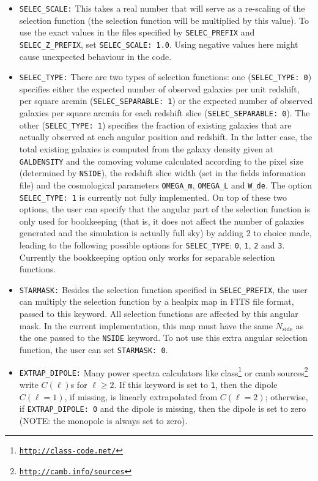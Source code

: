 \documentclass[12pt]{book} %
\newcommand{\nv}[1]{\mathrm{#1}}                 %
\begin{document}
\begin{itemize}
 \item {\tt SELEC\_SCALE:} This takes a real number that will serve as a re-scaling of the selection 
   function (the selection function will be multiplied by this value). To use the exact values in the 
   files specified by {\tt SELEC\_PREFIX} and {\tt SELEC\_Z\_PREFIX}, set {\tt SELEC\_SCALE: 1.0}. 
   Using negative values here might cause unexpected behaviour in the code.  

\item {\tt SELEC\_TYPE:} There are two types of selection functions: one ({\tt SELEC\_TYPE: 0}) 
  specifies either the expected number of observed galaxies per unit redshift, per square arcmin 
  ({\tt SELEC\_SEPARABLE: 1}) or the expected number of observed galaxies per square arcmin for each 
  redshift slice ({\tt SELEC\_SEPARABLE: 0}). The other ({\tt SELEC\_TYPE: 1}) specifies the 
  fraction of existing galaxies that are actually observed at each angular 
  position and redshift. In the latter case, the total existing galaxies 
  is computed from the galaxy density given at {\tt GALDENSITY} and the comoving volume calculated 
  according to the pixel size (determined by {\tt NSIDE}), the redshift slice width (set in the 
  fields information file) and the cosmological parameters {\tt OMEGA\_m}, {\tt OMEGA\_L} and 
  {\tt W\_de}. The option {\tt SELEC\_TYPE: 1} is currently not fully implemented. On top of these 
  two options, the user can specify that the angular part of the selection function is only 
  used for bookkeeping (that is, it does not affect the number of galaxies generated and the 
  simulation is actually full sky) by adding 2 to choice made, leading to the following possible 
  options for {\tt SELEC\_TYPE}: {\tt 0}, {\tt 1}, {\tt 2} and {\tt 3}. Currently the bookkeeping 
  option only works for separable selection functions. 

\item {\tt STARMASK:} Besides the selection function specified in {\tt SELEC\_PREFIX}, the user 
  can multiply the selection function by a {\sc healpix} map in FITS file format, passed to this 
  keyword. All selection functions are affected by this angular mask. In the current implementation, 
  this map must have the same $N_{\nv{side}}$ as the one passed to the {\tt NSIDE} keyword.
  To not use this extra angular selection function, the user can set {\tt STARMASK: 0}.

\item {\tt EXTRAP\_DIPOLE:} Many power spectra calculators like 
  {\sc class}\footnote{\tt{\href{http://class-code.net/}{http://class-code.net/}}} or 
  {\sc camb sources}\footnote{\tt{\href{http://camb.info/sources}{http://camb.info/sources}}} 
  write $C(\ell)$s for $\ell\geq 2$. If this keyword is set to {\tt 1}, then the dipole $C(\ell=1)$, 
  if missing, is linearly extrapolated from $C(\ell=2)$; otherwise, if {\tt EXTRAP\_DIPOLE: 0} and the 
  dipole is missing, then the dipole is set to zero (NOTE: the monopole is always set to zero).


\end{itemize}
\end{document}
